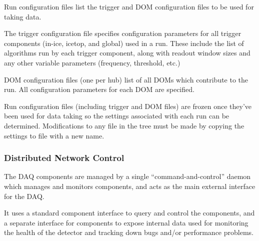 Run configuration files list the trigger and DOM configuration files to be
used for taking data.

The trigger configuration file specifies configuration parameters for all
trigger components (in-ice, icetop, and global) used in a run.  These include
the list of algorithms run by each trigger component, along with readout window
sizes and any other variable parameters (frequency, threshold, etc.)

DOM configuration files (one per hub) list of all DOMs which contribute to the
run.  All configuration parameters for each DOM are specified.

Run configuration files (including trigger and DOM files) are frozen once
they've been used for data taking so the settings associated with each run can
be determined.  Modifications to any file in the tree must be made by copying
the settings to file with a new name.

\subsubsection{Distributed Network Control}


The DAQ components are managed by a single ``command-and-control'' daemon
which manages and monitors components, and acts as the main
external interface for the DAQ.

It uses a standard component interface to query and
control the components, and a separate interface for components to expose
internal data used for monitoring the health of the detector and tracking
down bugs and/or performance problems.


